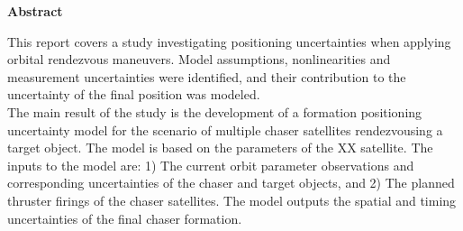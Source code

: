 \begin{center}
    \large
    \textbf{Abstract}
\end{center}{}
This report covers a study investigating positioning uncertainties when applying orbital rendezvous maneuvers. Model assumptions, nonlinearities and measurement uncertainties were identified, and their contribution to the uncertainty of the final position was modeled. \\

The main result of the study is the development of a formation positioning uncertainty model for the scenario of multiple chaser satellites rendezvousing a target object. The model is based on the parameters of the XX satellite. The inputs to the model are: 1) The current orbit parameter observations and corresponding uncertainties of the chaser and target objects, and 2) The planned thruster firings of the chaser satellites. The model outputs the spatial and timing uncertainties of the final chaser formation. \\
